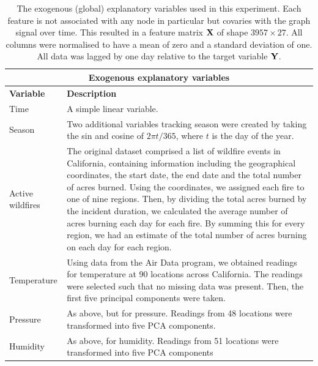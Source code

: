 \begin{table}[p]
    \renewcommand{\arraystretch}{2}
    \centering
    \begin{tabular}{l p{11cm}}
    \toprule
    \multicolumn{2}{c}{\textbf{Exogenous explanatory variables}} \\
    \midrule
    \textbf{Variable} & \textbf{Description} \\
    \midrule

    Time & A simple linear variable. \\

    Season & Two additional variables tracking season were created by taking the sin and cosine of $2 \pi t / 365$, where $t$ is the day of the year. \\

    Active wildfires & The original dataset comprised a list of wildfire events in California, containing information including the geographical coordinates, the start date, the end date and the total number of acres burned. Using the coordinates, we assigned each fire to one of nine regions. Then, by dividing the total acres burned by the incident duration, we calculated the average number of acres burning each day for each fire. By summing this for every region, we had an estimate of the total number of acres burning on each day for each region. \\

    Temperature & Using data from the Air Data program, we obtained readings for temperature at 90 locations across California. The readings were selected such that no missing data was present. Then, the first five principal components were taken. \\

    Pressure & As above, but for pressure. Readings from 48 locations were transformed into five PCA components. \\

    Humidity & As above, for humidity. Readings from 51 locations were transformed into five PCA components  \\
    \bottomrule
    \end{tabular}
    \vspace*{0.3cm}
    \caption[Global explanatory variables used in the environmental modelling application]{The exogenous (global) explanatory variables used in this experiment. Each feature is not associated with any node in particular but covaries with the graph signal over time. This resulted in a feature matrix $\mathbf{X}$ of shape $3957 \times 27$. All columns were normalised to have a mean of zero and a standard deviation of one. All data was lagged by one day relative to the target variable $\mathbf{Y}$. }
    \label{tab:features1}
\end{table}

